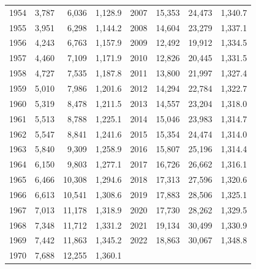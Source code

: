 \begin{longtable}{rrrr@{\hspace{1.2em}}rrrr}
1954 & 3,787 & 6,036 & 1,128.9 & 2007 & 15,353 & 24,473 & 1,340.7 \\
1955 & 3,951 & 6,298 & 1,144.2 & 2008 & 14,604 & 23,279 & 1,337.1 \\
1956 & 4,243 & 6,763 & 1,157.9 & 2009 & 12,492 & 19,912 & 1,334.5 \\
1957 & 4,460 & 7,109 & 1,171.9 & 2010 & 12,826 & 20,445 & 1,331.5 \\
1958 & 4,727 & 7,535 & 1,187.8 & 2011 & 13,800 & 21,997 & 1,327.4 \\
1959 & 5,010 & 7,986 & 1,201.6 & 2012 & 14,294 & 22,784 & 1,322.7 \\
1960 & 5,319 & 8,478 & 1,211.5 & 2013 & 14,557 & 23,204 & 1,318.0 \\
1961 & 5,513 & 8,788 & 1,225.1 & 2014 & 15,046 & 23,983 & 1,314.7 \\
1962 & 5,547 & 8,841 & 1,241.6 & 2015 & 15,354 & 24,474 & 1,314.0 \\
1963 & 5,840 & 9,309 & 1,258.9 & 2016 & 15,807 & 25,196 & 1,314.4 \\
1964 & 6,150 & 9,803 & 1,277.1 & 2017 & 16,726 & 26,662 & 1,316.1 \\
1965 & 6,466 & 10,308 & 1,294.6 & 2018 & 17,313 & 27,596 & 1,320.6 \\
1966 & 6,613 & 10,541 & 1,308.6 & 2019 & 17,883 & 28,506 & 1,325.1 \\
1967 & 7,013 & 11,178 & 1,318.9 & 2020 & 17,730 & 28,262 & 1,329.5 \\
1968 & 7,348 & 11,712 & 1,331.2 & 2021 & 19,134 & 30,499 & 1,330.9 \\
1969 & 7,442 & 11,863 & 1,345.2 & 2022 & 18,863 & 30,067 & 1,348.8 \\
1970 & 7,688 & 12,255 & 1,360.1 &  & & &  \\
\end{longtable}
\endgroup
